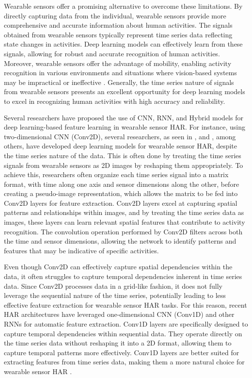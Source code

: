\documentclass[preprint,12pt]{elsarticle}
\begin{document}
Wearable sensors offer a promising alternative to overcome these limitations. By directly capturing data from the individual, wearable sensors provide more comprehensive and accurate information about human activities. The signals obtained from wearable sensors typically represent time series data reflecting state changes in activities. Deep learning models can effectively learn from these signals, allowing for robust and accurate recognition of human activities. Moreover, wearable sensors offer the advantage of mobility, enabling activity recognition in various environments and situations where vision-based systems may be impractical or ineffective \citep{dang2020sensor}. Generally, the time series nature of signals from wearable sensors presents an excellent opportunity for deep learning models to excel in recognizing human activities with high accuracy and reliability.

Several researchers have proposed the use of CNN, RNN, and Hybrid models for deep learning-based feature learning in wearable sensor HAR. For instance, using two-dimensional CNN (Conv2D), several researchers, as seen in \citep{gao2021danhar}, \citep{gupta2021deep} and \citep{erdacs2021human}, among others, have developed deep learning models for wearable sensor HAR, despite the time series nature of the data. This is often done by treating the time series signals from wearable sensors as 2D images by reshaping them appropriately. To achieve this, researchers often organize each time series signal into a matrix format, with time along one axis and sensor dimensions along the other, before creating a pseudo-image representation, which allows the matrix to be fed into Conv2D layers for feature extraction. Conv2D layers excel at capturing spatial patterns and relationships within images, and by treating the time series data as images, these layers can learn relevant spatial features that contribute to activity recognition. The convolution operation performed by Conv2D filters across both the time and sensor dimensions, allowing the network to identify patterns and features that may be indicative of specific activities.

Even though Conv2D can effectively capture spatial dependencies within the data, it often struggles to capture temporal dependencies inherent in time series data. Since Conv2D processes data in a grid-like fashion, it does not fully leverage the sequential nature of the time series, potentially leading to less effective feature extraction for wearable sensor HAR tasks. For this reason, recent HAR architectures have leveraged one-dimensional CNN (Conv1D) and other RNNs for automatic feature extraction. Conv1D layers are specifically designed to capture temporal dependencies within sequential data. They operate directly on the time series data without reshaping it into a 2D format, allowing them to capture temporal patterns more effectively. Conv1D layers are better suited for extracting features from time series data, making them a more natural choice for wearable sensor HAR \citep{mohd_noor_feature_2021}.
\end{document}
